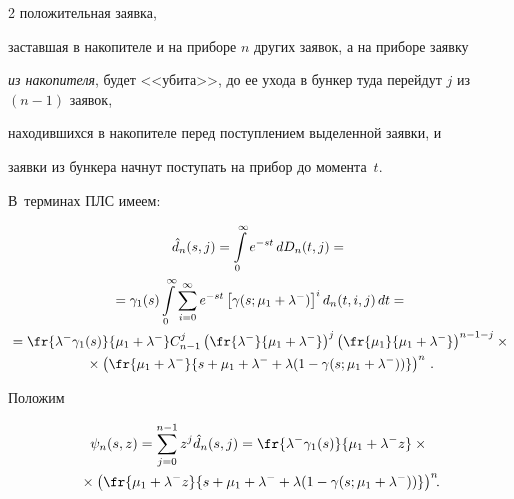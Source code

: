 \begin{multicols}{2}
положительная заявка,


заставшая в накопителе и на приборе $n$ других заявок, а на приборе заявку


\textit{из накопителя}, будет <<убита>>, до ее ухода в бункер туда перейдут $j$ из $(n-1)$ заявок,


находившихся в накопителе перед поступлением выделенной заявки, и


заявки из бункера начнут поступать на прибор до момента~$t$.


В~терминах ПЛС имеем:


\begin{multline*}


\hat d_n(s,j) = \int\limits_{0}^\infty


e^{-st}\, dD_n(t,j) ={}\\


{}= \gamma_1(s) \int\limits_{0}^{\infty}


\sum\limits_{i=0}^{\infty} e^{-st} \left[\gamma(s;\mu_1 + \lambda^-)\right]^i


d_n(t,i,j) \,dt


= {}\\


{}=


\fr{\lambda^- \gamma_1(s)}{ \mu_1 + \lambda^-}


C_{n-1}^j \left(\fr{\lambda^- }{ \mu_1 + \lambda^-}\right)^j


          \left(\fr{\mu_1 }{\mu_1 + \lambda^-}\right)^{n-1-j}\times{}\\


          {}\times


          \left(\fr{\mu_1+\lambda^-}{s + \mu_1 + \lambda^- + \lambda (1 - \gamma(s;\mu_1 + \lambda^-))}\right)^{n}\,.


\end{multline*}





Положим


\begin{multline*}


\psi_n(s,z)= \sum\limits_{j=0}^{n-1}


z^j \hat d_n(s,j) = \fr{\lambda^- \gamma_1(s)}{\mu_1 + \lambda^- z}\times{}\\


{}\times


          \left(\fr{\mu_1 + \lambda^- z }{


s + \mu_1 + \lambda^- + \lambda (1 - \gamma(s;\mu_1 + \lambda^-))}\right)^{n}\!\!.



\end{multline*}
\end{multicols}
